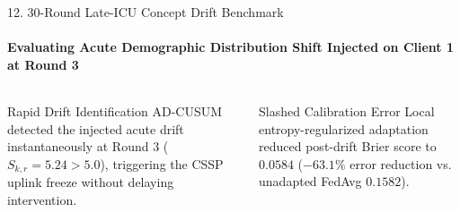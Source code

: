 \documentclass[aspectratio=169, 10pt]{beamer}
\begin{document}
\begin{frame}{12. 30-Round Late-ICU Concept Drift Benchmark}
    \framesubtitle{Evaluating Acute Demographic Distribution Shift Injected on Client 1 at Round 3}
    \begin{table}
        \centering
        \scriptsize
        \renewcommand{\arraystretch}{1.15}
    \end{table}

    \begin{columns}[T]
        \begin{block}{\scriptsize Rapid Drift Identification}
            \scriptsize
            AD-CUSUM detected the injected acute drift instantaneously at Round 3 ($S_{k, r} = 5.24 > 5.0$), triggering the CSSP uplink freeze without delaying intervention.
        \end{block}

        \begin{block}{\scriptsize Slashed Calibration Error}
            \scriptsize
            Local entropy-regularized adaptation reduced post-drift Brier score to $\mathbf{0.0584}$ ($\mathbf{-63.1\%}$ error reduction vs. unadapted FedAvg $0.1582$).
        \end{block}
    \end{columns}
\end{frame}
\end{document}
